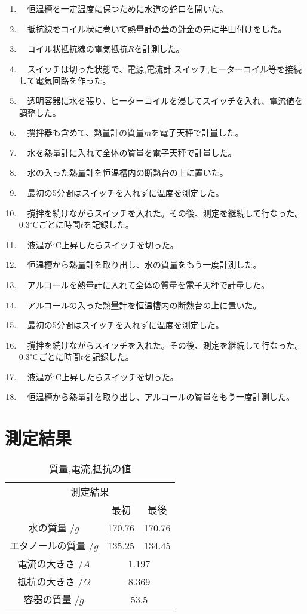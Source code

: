 \documentclass{jsarticle}
\begin{document}
\begin{enumerate}
	\item　恒温槽を一定温度に保つために水道の蛇口を開いた。
	\item　抵抗線をコイル状に巻いて熱量計の蓋の針金の先に半田付けをした。
	\item　コイル状抵抗線の電気抵抗$R$を計測した。
	\item　スイッチは切った状態で、電源,電流計,スイッチ,ヒーターコイル等を接続して電気回路を作った。
	\item　透明容器に水を張り、ヒーターコイルを浸してスイッチを入れ、電流値を調整した。
	\item　攪拌器も含めて、熱量計の質量$m$を電子天秤で計量した。
	\item　水を熱量計に入れて全体の質量を電子天秤で計量した。
	\item　水の入った熱量計を恒温槽内の断熱台の上に置いた。
	\item　最初の5分間はスイッチを入れずに温度を測定した。
	\item　撹拌を続けながらスイッチを入れた。その後、測定を継続して行なった。$0.3^\circ\textrm{C}$ごとに時間$t$を記録した。
	\item　液温が$^\circ\textrm{C}$上昇したらスイッチを切った。
	\item　恒温槽から熱量計を取り出し、水の質量をもう一度計測した。
	\item　アルコールを熱量計に入れて全体の質量を電子天秤で計量した。
	\item　アルコールの入った熱量計を恒温槽内の断熱台の上に置いた。
	\item　最初の5分間はスイッチを入れずに温度を測定した。
	\item　撹拌を続けながらスイッチを入れた。その後、測定を継続して行なった。$0.3^\circ\textrm{C}$ごとに時間$t$を記録した。
	\item　液温が$^\circ\textrm{C}$上昇したらスイッチを切った。
	\item　恒温槽から熱量計を取り出し、アルコールの質量をもう一度計測した。
\end{enumerate}


\section{測定結果}

\begin{table}[H]
\centering
\caption{質量,電流,抵抗の値}
\label{my-label}
\begin{tabular}{ccc}
\multicolumn{3}{c}{測定結果}             \\
         & 最初          & 最後          \\
水の質量 $/g$    & 170.76      & 170.76      \\
エタノールの質量 $/g$ & 135.25      & 134.45      \\
電流の大きさ $/A$  & \multicolumn{2}{c}{1.197} \\
抵抗の大きさ $/\Omega$  & \multicolumn{2}{c}{8.369} \\
容器の質量 $/g$  & \multicolumn{2}{c}{53.5}
\end{tabular}
\end{table}
\end{document}
